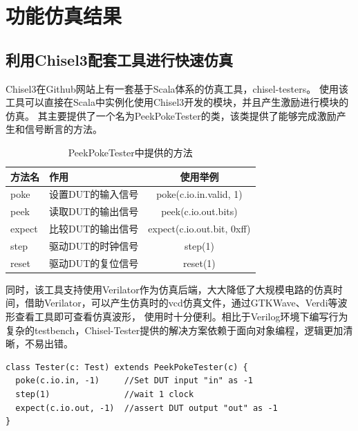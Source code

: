 \chapter{功能仿真结果}

\section{利用Chisel3配套工具进行快速仿真}
Chisel3在Github网站上有一套基于Scala体系的仿真工具，chisel-testers。
使用该工具可以直接在Scala中实例化使用Chisel3开发的模块，并且产生激励进行模块的仿真。
其主要提供了一个名为PeekPokeTester的类，该类提供了能够完成激励产生和信号断言的方法。
\begin{table}[h] %
    \centering
    \caption{PeekPokeTester中提供的方法} %
    \begin{tabular}{l|l|c} %
    \hline  
    \hline  
    方法名 & 作用 & 使用举例 \\ %
    \hline %
    poke & 设置DUT的输入信号 & poke(c.io.in.valid, 1) \\
    \hline  
    peek & 读取DUT的输出信号 & peek(c.io.out.bits) \\
    \hline  
    expect & 比较DUT的输出信号 & expect(c.io.out.bit, 0xff) \\
    \hline  
    step & 驱动DUT的时钟信号 & step(1) \\
    \hline
    reset & 驱动DUT的复位信号 & reset(1) \\
    \hline  
    \hline  
    \end{tabular}  
\end{table}
同时，该工具支持使用Verilator作为仿真后端，大大降低了大规模电路的仿真时间，借助Verilator，可以产生仿真时的vcd仿真文件，通过GTKWave、Verdi等波形查看工具即可查看仿真波形，
使用时十分便利。相比于Verilog环境下编写行为复杂的testbench，Chisel-Tester提供的解决方案依赖于面向对象编程，逻辑更加清晰，不易出错。
            \begin{lstlisting}[title=Chisel Test Example, frame=shadowbox]
class Tester(c: Test) extends PeekPokeTester(c) {
  poke(c.io.in, -1)     //Set DUT input "in" as -1
  step(1)               //wait 1 clock
  expect(c.io.out, -1)  //assert DUT output "out" as -1
}
            \end{lstlisting}

